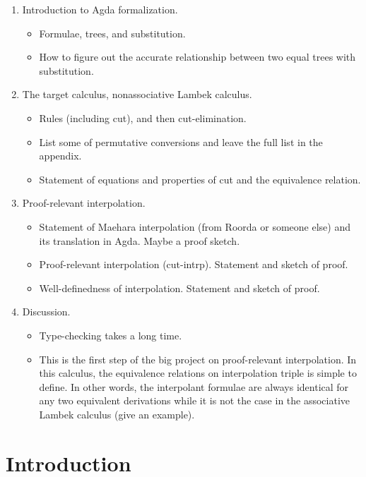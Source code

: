 \documentclass[runningheads]{llncs}
\begin{document}
\begin{enumerate}
  \item Introduction to Agda formalization.
  \begin{itemize}
    \item Formulae, trees, and substitution.
    \item How to figure out the accurate relationship between two equal trees with substitution.
  \end{itemize}
  \item The target calculus, nonassociative Lambek calculus.
  \begin{itemize}
    \item Rules (including cut), and then cut-elimination.
    \item List some of permutative conversions and leave the full list in the appendix.
    \item Statement of equations and properties of cut and the equivalence relation.
  \end{itemize}
  \item Proof-relevant interpolation.
  \begin{itemize}
    \item Statement of Maehara interpolation (from Roorda or someone else) and its translation in Agda. Maybe a proof sketch.
    \item Proof-relevant interpolation (cut-intrp). Statement and sketch of proof.
    \item Well-definedness of interpolation. Statement and sketch of proof.
  \end{itemize}
  \item Discussion.
  \begin{itemize}
    \item Type-checking takes a long time.
    \item This is the first step of the big project on proof-relevant interpolation. In this calculus, the equivalence relations on interpolation triple is simple to define. In other words, the interpolant formulae are always identical for any two equivalent derivations while it is not the case in the associative Lambek calculus (give an example).
  \end{itemize}
\end{enumerate}

\section{Introduction}
\end{document}
